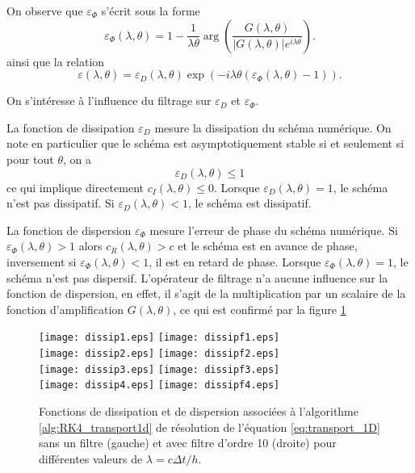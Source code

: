 \begin{remarque}
On observe que $\varepsilon_{\Phi}$ s'écrit sous la forme
\begin{equation}
\varepsilon_{\Phi}(\lambda, \theta) = 1 - \dfrac{1}{\lambda \theta} \arg \left( \dfrac{G(\lambda, \theta)}{|G(\lambda,\theta)| e^{i \lambda \theta}} \right).
\end{equation}
ainsi que la relation
\begin{equation}
\varepsilon(\lambda,\theta) = \varepsilon_D(\lambda,\theta) \exp \left( - i \lambda \theta \left( \varepsilon_{\Phi}(\lambda,\theta) -1 \right) \right).
\end{equation}
\end{remarque}

On s’intéresse à l'influence du filtrage sur $\varepsilon_D$ et $\varepsilon_{\Phi}$. 

La fonction de dissipation $\varepsilon_D$ mesure la dissipation du schéma numérique. On note en particulier que le schéma est asymptotiquement stable si et seulement si pour tout $\theta$, on a 
\begin{equation}
\varepsilon_D(\lambda,\theta) \leq 1
\end{equation}
ce qui implique directement $c_I(\lambda,\theta) \leq 0$. Lorsque $\varepsilon_D(\lambda, \theta) = 1$, le schéma n'est pas dissipatif. Si $\varepsilon_D(\lambda,\theta) < 1$, le schéma est dissipatif.

La fonction de dispersion $\varepsilon_{\Phi}$ mesure l'erreur de phase du schéma numérique. Si $\varepsilon_{\Phi}(\lambda, \theta) > 1$ alors $c_R(\lambda,\theta) > c$ et le schéma est en avance de phase, inversement si $\varepsilon_{\Phi}(\lambda, \theta) < 1$, il est en retard de phase. Lorsque $\varepsilon_{\Phi}(\lambda, \theta) = 1$, le schéma n'est pas dispersif.
L'opérateur de filtrage n'a aucune influence sur la fonction de dispersion, en effet, il s'agit de la multiplication par un scalaire de la fonction d'amplification $G(\lambda,\theta)$, ce qui est confirmé par la figure \ref{fig:dissip_disper}

\begin{figure}[htbp]
\begin{center}
\texttt{[image: dissip1.eps]}
\texttt{[image: dissipf1.eps]}\\
\texttt{[image: dissip2.eps]}
\texttt{[image: dissipf2.eps]}\\
\texttt{[image: dissip3.eps]}
\texttt{[image: dissipf3.eps]}\\
\texttt{[image: dissip4.eps]}
\texttt{[image: dissipf4.eps]}
\end{center}
\caption{Fonctions de dissipation et de dispersion associées à l'algorithme \ref{alg:RK4_transport1d} de résolution de l'équation \eqref{eq:transport_1D} sans un filtre (gauche) et avec filtre d'ordre 10 (droite) pour différentes valeurs de $\lambda = c \Delta t / h$.}
\label{fig:dissip_disper}
\end{figure}

